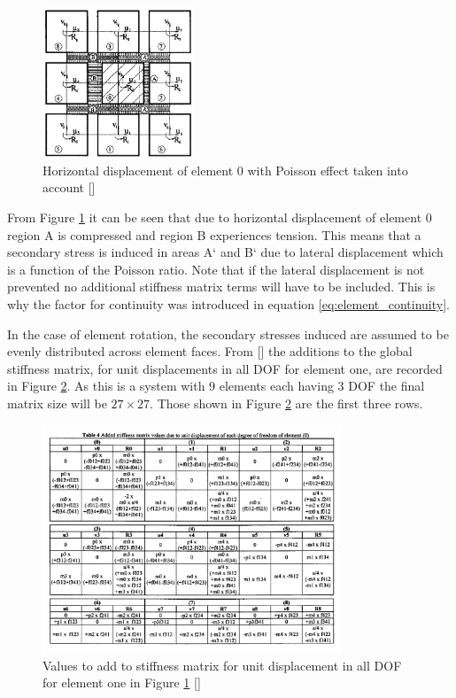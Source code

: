 \begin{figure}[H]
\centering
\includegraphics[width=0.4\textwidth]{../Poisson_effect_element_grid_AEM.png}
\caption{Horizontal displacement of element 0 with Poisson effect taken into account [\cite{First_AEM}]}
\label{fig:Poisson_effect_element_grid_AEM}
\end{figure}

From Figure \ref{fig:Poisson_effect_element_grid_AEM} it can be seen that due to horizontal displacement of element 0 region A is compressed and region B experiences tension.  This means that a secondary stress is induced in areas A` and B` due to lateral displacement which is a function of the Poisson ratio.  Note that if the lateral displacement is not prevented no additional stiffness matrix terms will have to be included.  This is why the factor for continuity was introduced in equation \ref{eq:element_continuity}. 

In the case of element rotation, the secondary stresses induced are assumed to be evenly distributed across element faces. From [\cite{First_AEM}] the additions to the global stiffness matrix, for unit displacements in all DOF for element one, are recorded in Figure \ref{fig:Poisson_additions_stifmat_AEM}.  As this is a system with 9 elements each having 3 DOF the final matrix size will be $27 \times 27$.  Those shown in Figure \ref{fig:Poisson_additions_stifmat_AEM} are the first three rows. 

\begin{figure}[H]
\centering
\includegraphics[width=0.8\textwidth]{../Poisson_additions_stifmat_AEM.png}
\caption{Values to add to stiffness matrix for unit displacement in all DOF for element one in Figure \ref{fig:Poisson_effect_element_grid_AEM} [\cite{First_AEM}]}
\label{fig:Poisson_additions_stifmat_AEM}
\end{figure}

